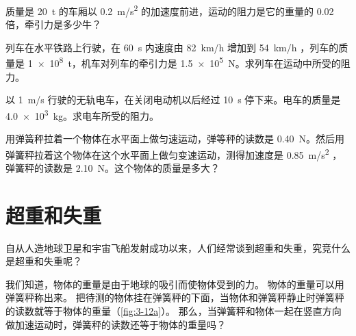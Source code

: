 \begin{Practice}
\begin{question}
\item 质量是 \qty{20}{t} 的车厢以 \qty{0.2}{m/s^2} 的加速度前进，运动的阻力是它的重量的 0.02 倍，牵引力是多少牛？
\item 列车在水平铁路上行驶，在 \qty{60}{s} 内速度由 \qty{82}{km/h} 增加到 \qty{54}{km/h} ，列车的质量是 \qty{1e8}{t}，机车对列车的牵引力是 \qty{1.5e5}{N}。求列车在运动中所受的阻力。
\item 以 \qty{1}{m/s} 行驶的无轨电车，在关闭电动机以后经过 \qty{10}{s} 停下来。电车的质量是 \qty{4.0e3}{kg}。求电车所受的阻力。
\item 用弹簧秤拉着一个物体在水平面上做匀速运动，弹等秤的读数是 \qty{0.40}{N}。然后用弹簧秤拉着这个物体在这个水平面上做匀变速运动，测得加速度是 \qty{0.85}{m/s^2} ，弹簧秤的读数是 \qty{2.10}{N}。这个物体的质量是多大？
\end{question}
\end{Practice}

\section{超重和失重}
自从人造地球卫星和宇宙飞船发射成功以来，人们经常谈到超重和失重，究竞什么是超重和失重呢？

我们知道，物体的重量是由于地球的吸引而使物体受到的力。
物体的重量可以用弹簧秤称出来。
把待测的物体挂在弹簧秤的下面，当物体和弹簧秤静止时弹簧秤的读数就等于物体的重量（\cref{fig:3-12a}）。
那么，当弹簧秤和物体一起在竖直方向做加速运动时，弹簧秤的读数还等于物体的重量吗？

